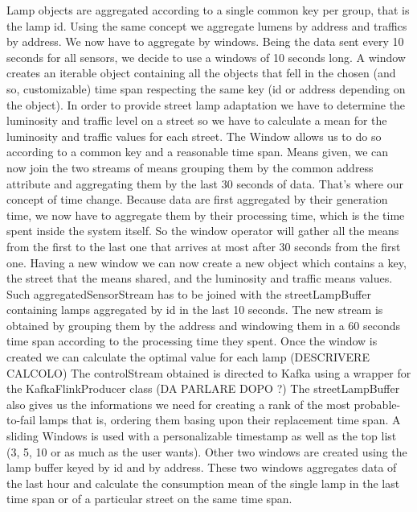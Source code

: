 Lamp objects are aggregated according to a single common key per group, that is the lamp id. Using the same concept we aggregate lumens by address and traffics by address.
We now have to aggregate by windows. Being the data sent every 10 seconds for all sensors, we decide to use a windows of 10 seconds long. A window creates an iterable object containing all the objects that fell in the chosen (and so, customizable) time span respecting the same key (id or address depending on the object). In order to provide street lamp adaptation we have to determine the luminosity and traffic level on a street so we have to calculate a mean for the luminosity and traffic values for each street. The Window allows us to do so according to a common key and a reasonable time span. Means given, we can now join the two streams of means grouping them by the common address attribute and aggregating them by the last 30 seconds of data. That’s where our concept of time change. Because data are first aggregated by their generation time, we now have to aggregate them by their processing time, which is the time spent inside the system itself. So the window operator will gather all the means from the first to the last one that arrives at most after 30 seconds from the first one. Having a new window we can now create a new object which contains a key, the street that the means shared, and the luminosity and traffic means values.
Such aggregatedSensorStream has to be joined with the streetLampBuffer containing lamps aggregated by id in the last 10 seconds. The new stream is obtained by grouping them by the address and windowing them in a 60 seconds time span according to the processing time they spent. Once the window is created we can calculate the optimal value for each lamp
(DESCRIVERE CALCOLO)
The controlStream obtained is directed to Kafka using a wrapper for the KafkaFlinkProducer class (DA PARLARE DOPO ?)
The streetLampBuffer also gives us the informations we need for creating a rank of the most probable-to-fail lamps that is, ordering them basing upon their replacement time span. A sliding Windows is used with a personalizable timestamp as well as the top list (3, 5, 10 or as much as the user wants). Other two windows are created using the lamp buffer keyed by id and by address. These two windows aggregates data of the last hour and calculate the consumption mean of the single lamp in the last time span or of a particular street on the same time span.

